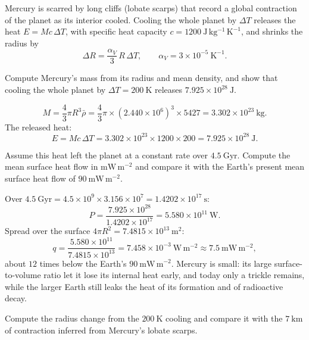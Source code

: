 Mercury is scarred by long cliffs (lobate scarps) that record a global contraction of the planet as its interior cooled.
Cooling the whole planet by $\Delta T$ releases the heat $E = M c\, \Delta T$, with specific heat capacity $c = 1200\ \mathrm{J\,kg^{-1}\,K^{-1}}$, and shrinks the radius by
\[
  \Delta R = \frac{\alpha_V}{3}\, R\, \Delta T, \qquad \alpha_V = 3 \times 10^{-5}\ \mathrm{K^{-1}}.
\]

\parti {} Compute Mercury's mass from its radius and mean density, and show that cooling the whole planet by $\Delta T = 200\ \mathrm{K}$ releases $7.925 \times 10^{28}\ \mathrm{J}$.

\begin{solution}
\[
  M = \frac{4}{3}\pi R^3 \bar{\rho} = \frac{4}{3}\pi \times (2.440 \times 10^{6})^3 \times 5427 = 3.302 \times 10^{23}\ \mathrm{kg}.
\]
The released heat:
\[
  E = M c\, \Delta T = 3.302 \times 10^{23} \times 1200 \times 200 = 7.925 \times 10^{28}\ \mathrm{J}.
\]
\end{solution}

\parti {} Assume this heat left the planet at a constant rate over $4.5\ \mathrm{Gyr}$.
Compute the mean surface heat flow in $\mathrm{mW\,m^{-2}}$ and compare it with the Earth's present mean surface heat flow of $90\ \mathrm{mW\,m^{-2}}$.

\begin{solution}
Over $4.5\ \mathrm{Gyr} = 4.5 \times 10^{9} \times 3.156 \times 10^{7} = 1.4202 \times 10^{17}\ \mathrm{s}$:
\[
  P = \frac{7.925 \times 10^{28}}{1.4202 \times 10^{17}} = 5.580 \times 10^{11}\ \mathrm{W}.
\]
Spread over the surface $4\pi R^2 = 7.4815 \times 10^{13}\ \mathrm{m^2}$:
\[
  q = \frac{5.580 \times 10^{11}}{7.4815 \times 10^{13}} = 7.458 \times 10^{-3}\ \mathrm{W\,m^{-2}} \approx 7.5\ \mathrm{mW\,m^{-2}},
\]
about $12$ times below the Earth's $90\ \mathrm{mW\,m^{-2}}$.
Mercury is small: its large surface-to-volume ratio let it lose its internal heat early, and today only a trickle remains, while the larger Earth still leaks the heat of its formation and of radioactive decay.
\end{solution}

\parti {} Compute the radius change from the $200\ \mathrm{K}$ cooling and compare it with the $7\ \mathrm{km}$ of contraction inferred from Mercury's lobate scarps.

